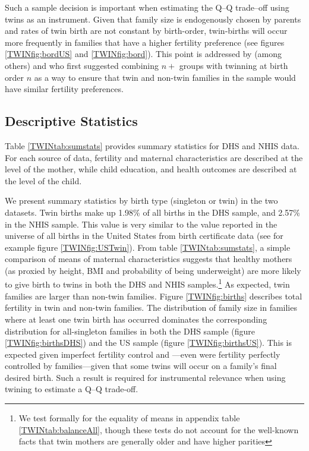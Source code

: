 \documentclass[subeqn]{article}
\begin{document}
\begin{spacing}{1.4}
Such a sample decision is important when estimating the Q--Q trade--off using 
twins as an instrument. Given that family size is endogenously chosen by 
parents and rates of twin birth are not constant by birth-order, twin-births will 
occur more frequently in families that have a higher fertility preference (see
figures \ref{TWINfig:bordUS} and \ref{TWINfig:bord}). This point is addressed by
(among others) \citet{RosenzweigWolpin1980} and \citet{Blacketal2005} who first
suggested combining $n+$ groups with twinning at birth order $n$ as a way to
ensure that twin and non-twin families in the sample would have similar fertility 
preferences.

\subsection{Descriptive Statistics}                \label{TWINsscn:descriptives}
Table \ref{TWINtab:sumstats} provides summary statistics for DHS and NHIS data.
For each source of data, fertility and maternal characteristics are described at
the level of the mother, while child education, and health outcomes are
described at the level of the child. 

We present summary statistics by birth type (singleton or twin) in the two
datasets.  Twin births make up 1.98\% of all births in the DHS sample, and
2.57\% in the NHIS sample.  This value is very similar to the value reported in
the universe of all births in the United States from birth certificate data (see
for example figure \ref{TWINfig:USTwin}). From table \ref{TWINtab:sumstats}, a
simple comparison of means of maternal characteristics suggests that healthy
mothers (as proxied by height, BMI and probability of being underweight) are
more likely to give birth to twins in both the DHS and NHIS samples.\footnote{We
  test formally for the equality of means in appendix table
  \ref{TWINtab:balanceAll}, though these tests do not account for the well-known
  facts that twin mothers are generally older and have higher parities} As
expected, twin families are larger than non-twin families. Figure
\ref{TWINfig:births} describes total fertility in twin and non-twin families.
The distribution of family size in families where at least one twin birth has
occurred dominates the corresponding distribution for all-singleton families in
both the DHS sample (figure \ref{TWINfig:birthsDHS}) and the US sample (figure
\ref{TWINfig:birthsUS}). This is expected given imperfect fertility control and%
---even were fertility perfectly controlled by families---given that some twins
will occur on a family's final desired birth.  Such a result is required for
instrumental relevance when using twining to estimate a Q--Q trade-off.


\end{spacing}
\end{document}
